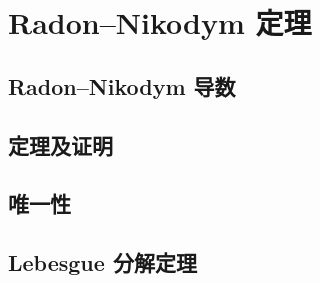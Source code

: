 \section{Radon–Nikodym 定理}
\label{b1:sec:0604}


\subsection{Radon–Nikodym 导数}
\label{b1:subsec:060401}

\subsection{定理及证明}
\label{b1:subsec:060402}

\subsection{唯一性}
\label{b1:subsec:060403}

\subsection{Lebesgue 分解定理}
\label{b1:subsec:060404}


